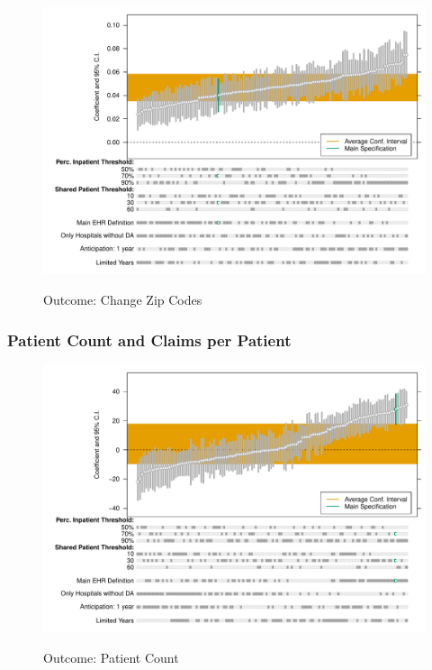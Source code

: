 \documentclass[12pt]{article}
\begin{document}
\begin{figure}[ht]
    \centering
    \caption{Outcome: Change Zip Codes}
    \includegraphics[scale=.6]{Objects/change_zip_chart.pdf}
    \label{fig:zip_chart}
\end{figure}




\subsubsection{Patient Count and Claims per Patient}

\begin{figure}[ht]
    \centering
    \caption{Outcome: Patient Count}
    \includegraphics[scale=.6]{Objects/patient_chart.pdf}
    \label{fig:pat_chart}
\end{figure}
\end{document}
